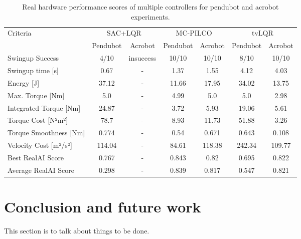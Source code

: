 \begin{table}[H]
  \centering
 \begin{tabular}{lcccccc}
 \hline
 Criteria & \multicolumn{2}{c}{SAC+LQR} & \multicolumn{2}{c}{MC-PILCO} & \multicolumn{2}{c}{tvLQR} \\
 & Pendubot & Acrobot & Pendubot & Acrobot & Pendubot & Acrobot \\
 \hline
 Swingup Success & 4/10 & insuccess & 10/10 & 10/10 & 8/10 & 10/10 \\
 Swingup time [s] & 0.67 & - & 1.37 & 1.55 & 4.12 & 4.03 \\
 Energy [J] & 37.12 & - & 11.66 & 17.95 & 34.02 & 13.75 \\
 Max. Torque [Nm] & 5.0 & - & 4.99 & 5.0 & 5.0 & 2.98 \\
 Integrated Torque [Nm] & 24.87 & - & 3.72 & 5.93 & 19.06 & 5.61 \\
 Torque Cost [N²m²] & 78.7 & - & 8.93 & 11.73 & 51.88 & 3.26 \\
 Torque Smoothness [Nm] & 0.774 & - & 0.54 & 0.671 & 0.643 & 0.108 \\
 Velocity Cost [m²/s²] & 114.04 & - & 84.61 & 118.38 & 242.34 & 109.77 \\
 Best RealAI Score & 0.767 & - & 0.843 & 0.82 & 0.695 & 0.822 \\
 Average RealAI Score & 0.298 & - & 0.839 & 0.817 & 0.547 & 0.821 \\
 \hline
 \end{tabular}
 \caption{Real hardware performance scores of multiple controllers for pendubot and acrobot experiments.}
 \label{tab:performance}
\end{table}



\section{Conclusion and future work}
This section is to talk about things to be done.

\cleardoublepage
